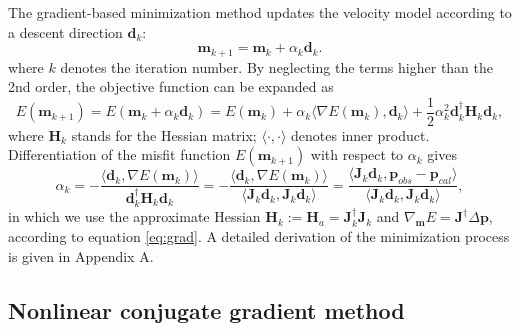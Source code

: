 The gradient-based minimization method updates the velocity model according to a descent direction $\textbf{d}_k$:
\begin{equation}\label{eq:cg}
\textbf{m}_{k+1}=\textbf{m}_k+\alpha_k \textbf{d}_k.
\end{equation}
where $k$ denotes the iteration number. By neglecting the terms higher than the 2nd order, the objective function can be expanded as
\begin{equation}
E(\textbf{m}_{k+1})=E(\textbf{m}_k+\alpha_k \textbf{d}_{k})=E(\textbf{m}_k)+\alpha_k \langle\nabla E(\textbf{m}_k),\textbf{d}_k\rangle+\frac{1}{2}\alpha_k^2\textbf{d}_k^{\dagger}\textbf{H}_k\textbf{d}_k,
\end{equation}
where $\textbf{H}_k$ stands for the Hessian matrix; $\langle\cdot,\cdot\rangle$ denotes inner product. Differentiation of the misfit function $E(\textbf{m}_{k+1})$ with respect to $\alpha_k$ gives
\begin{equation}\label{eq:alpha1}
\alpha_k=-\frac{\langle\textbf{d}_k,\nabla E(\textbf{m}_k)\rangle}{\textbf{d}_k^{\dagger}\textbf{H}_k\textbf{d}_k}
=-\frac{\langle\textbf{d}_k,\nabla E(\textbf{m}_k)\rangle}{\langle\textbf{J}_k\textbf{d}_k,\textbf{J}_k\textbf{d}_k\rangle}
=\frac{\langle\textbf{J}_k\textbf{d}_k,\textbf{p}_{obs}-\textbf{p}_{cal}\rangle}{\langle\textbf{J}_k\textbf{d}_k,\textbf{J}_k\textbf{d}_k\rangle},
\end{equation}
in which we use the approximate Hessian $\textbf{H}_k:=\textbf{H}_a=\textbf{J}_k^{\dagger}\textbf{J}_k$ and $\nabla_{\textbf{m}}E=\textbf{J}^{\dagger}\Delta \textbf{p}$, according to equation \eqref{eq:grad}. A detailed derivation of the minimization process is given in Appendix A.


\subsection{Nonlinear conjugate gradient method}

